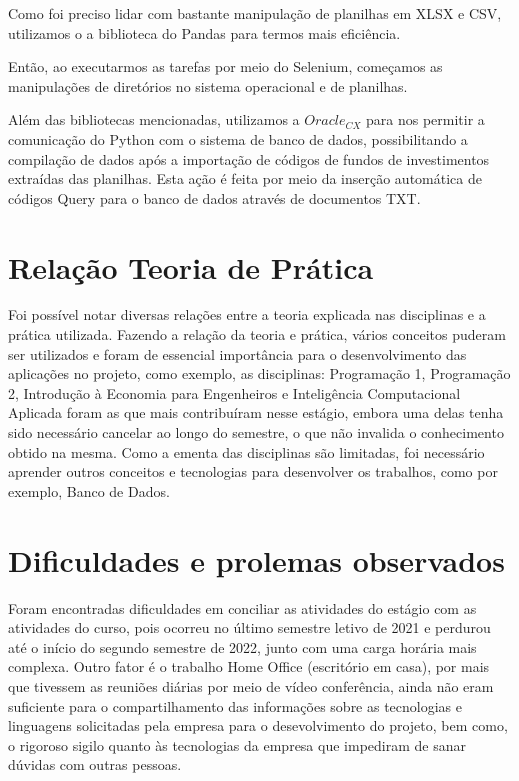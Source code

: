 \documentclass[english,brazil,oneside]{ifestagio}
\begin{document}
Como foi preciso lidar com bastante manipulação de planilhas em XLSX e CSV, utilizamos o a biblioteca do Pandas para termos mais eficiência. 

Então, ao executarmos as tarefas por meio do Selenium, começamos as manipulações de diretórios no sistema operacional e de planilhas. 

Além das bibliotecas mencionadas, utilizamos a $Oracle_{CX}$ para nos permitir a comunicação do Python com o sistema de banco de dados, possibilitando a compilação de dados após a importação de códigos de fundos de investimentos extraídas das planilhas. Esta ação é feita por meio da inserção automática de códigos Query para o banco de dados através de documentos TXT. 







\chapter{Relação Teoria de Prática}
Foi possível notar diversas relações entre a teoria explicada nas disciplinas e a prática utilizada. Fazendo a relação da teoria e prática, vários conceitos puderam ser utilizados e foram de essencial importância para o desenvolvimento das aplicações no projeto, como exemplo, as disciplinas:
Programação 1, Programação 2, Introdução à Economia para Engenheiros e Inteligência Computacional Aplicada foram as que mais contribuíram nesse estágio, embora uma delas tenha sido necessário cancelar ao longo do semestre, o que não invalida o conhecimento obtido na mesma. Como a ementa das disciplinas
são limitadas, foi necessário aprender outros conceitos e tecnologias para desenvolver os trabalhos, como por exemplo, Banco de Dados.


\chapter{Dificuldades e prolemas observados}
Foram encontradas dificuldades em conciliar as atividades do estágio com as atividades
do curso, pois ocorreu no último semestre letivo de 2021 e perdurou até o início do segundo semestre de 2022, junto com uma carga horária mais complexa.
Outro fator é o trabalho Home Office (escritório em casa), por mais que tivessem as
reuniões diárias por meio de vídeo conferência, ainda não eram suficiente para o
compartilhamento das informações sobre as tecnologias e linguagens solicitadas pela empresa para o desevolvimento do projeto, bem como, o rigoroso sigilo quanto às tecnologias da
empresa que impediram de sanar dúvidas com outras pessoas.
\end{document}
